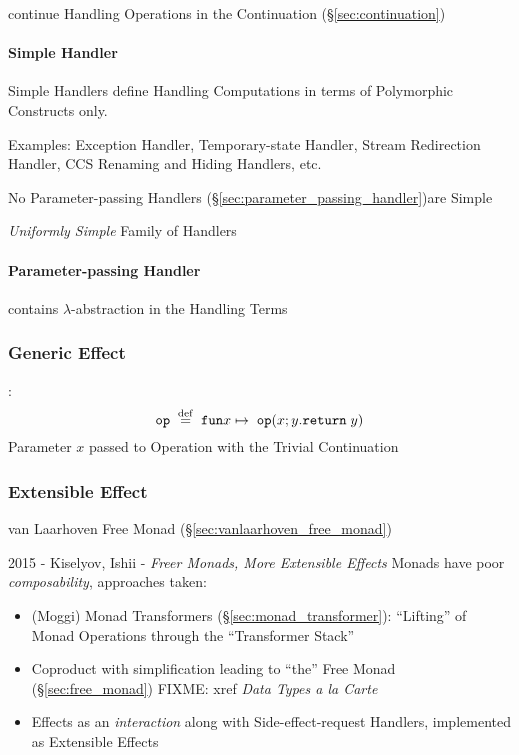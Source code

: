 continue Handling Operations in the Continuation
(\S\ref{sec:continuation})



\paragraph{Simple Handler}\label{sec:simple_handler}\hfill
\cite{plotkin-pretnar13}

Simple Handlers define Handling Computations in terms of Polymorphic
Constructs only.

Examples: Exception Handler, Temporary-state Handler, Stream
Redirection Handler, CCS Renaming and Hiding Handlers, etc.

No Parameter-passing Handlers
(\S\ref{sec:parameter_passing_handler})are Simple

\emph{Uniformly Simple} Family of Handlers



\paragraph{Parameter-passing Handler}\hfill
\label{sec:parameter_passing_handler}
\cite{plotkin-pretnar13}

contains $\lambda$-abstraction in the Handling Terms



\subsubsection{Generic Effect}\label{sec:generic_effect}

\cite{pretnar15}:
\[
  \mathtt{op}\; \stackrel{\mathrm{def}}{=} \;\mathtt{fun} x \mapsto
  \;\mathtt{op}(x; y.\mathtt{return}\; y)
\]
Parameter $x$ passed to Operation with the Trivial Continuation



\subsubsection{Extensible Effect}\label{sec:extensible_effect}

van Laarhoven Free Monad (\S\ref{sec:vanlaarhoven_free_monad})

2015 - Kiselyov, Ishii - \emph{Freer Monads, More Extensible Effects}
Monads have poor \emph{composability}, approaches taken:
\begin{itemize}
  \item (Moggi) Monad Transformers (\S\ref{sec:monad_transformer}): ``Lifting''
    of Monad Operations through the ``Transformer Stack''
  \item Coproduct with simplification leading to ``the'' Free Monad
    (\S\ref{sec:free_monad}) FIXME: xref \emph{Data Types a la Carte}
  \item Effects as an \emph{interaction} along with Side-effect-request
    Handlers, implemented as Extensible Effects
\end{itemize}

